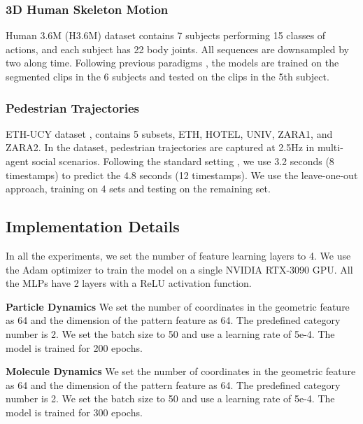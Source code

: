 \documentclass[10pt,twocolumn,letterpaper]{article}
\begin{document}
\subsubsection{3D Human Skeleton Motion}
Human 3.6M (H3.6M) dataset \cite{ionescu2013human3} contains 7 subjects performing 15 classes of actions, and each subject has 22 body joints. All sequences are downsampled by two along time. Following previous paradigms \cite{martinez2017human,li2020dynamic}, the models are trained on the segmented clips in the 6 subjects and tested on the clips in the 5th subject.

\subsubsection{Pedestrian Trajectories}
ETH-UCY dataset \cite{lerner2007crowds,pellegrini2009you}, contains 5 subsets, ETH, HOTEL, UNIV, ZARA1, and ZARA2. 
In the dataset, pedestrian trajectories are captured at 2.5Hz in multi-agent social scenarios. 
Following the standard setting \cite{alahi2016social,gupta2018social,yuan2021agentformer}, we use 3.2 seconds (8 timestamps) to predict the 4.8 seconds (12 timestamps). 
We use the leave-one-out approach, training on 4 sets and testing on the remaining set.





\subsection{Implementation Details}
In all the experiments, we set the number of feature learning layers  to 4. We use the Adam optimizer to train the model on a single NVIDIA RTX-3090 GPU. All the MLPs have 2 layers with a ReLU activation function. 

\vspace{0.2cm}
\noindent\textbf{Particle Dynamics} We set the number of coordinates in the geometric feature  as 64 and the dimension of the pattern feature  as 64. The predefined category number  is 2. We set the batch size to 50 and use a learning rate of 5e-4. The model is trained for 200 epochs. 

\vspace{0.2cm}
\noindent\textbf{Molecule Dynamics} We set the number of coordinates in the geometric feature  as 64 and the dimension of the pattern feature  as 64. The predefined category number  is 2. We set the batch size to 50 and use a learning rate of 5e-4. The model is trained for 300 epochs. 
\end{document}
